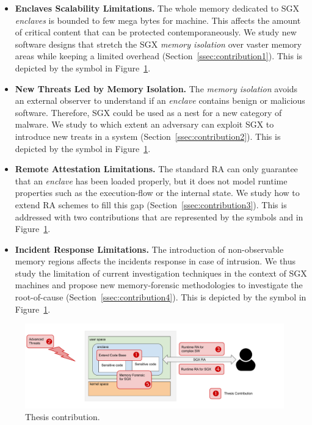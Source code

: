 \begin{itemize}
	\item \textbf{Enclaves Scalability Limitations.} The whole memory dedicated 
	to SGX \emph{enclaves} is bounded to few mega bytes for machine. This 
	affects the amount of critical content that can be protected 
	contemporaneously.
	We study new software designs that stretch the SGX \emph{memory isolation} 
	over vaster memory areas while keeping a limited overhead 
	(Section~\ref{ssec:contribution1}).
	This is depicted by the symbol \circledr[1] in 
	Figure~\ref{fig:contribution}.
	
	\item \textbf{New Threats Led by Memory Isolation.} The \emph{memory 
	isolation} avoids an external observer to understand if an \emph{enclave} 
	contains benign or malicious software. Therefore, SGX could be used as a 
	nest for a new category of malware.
	We study to which extent an adversary can exploit SGX to introduce new 
	treats 	in a system (Section~\ref{ssec:contribution2}).
	This is depicted by the symbol \circledr[2] in 	
	Figure~\ref{fig:contribution}.
	
	\item \textbf{Remote Attestation Limitations.} The standard RA can only 
	guarantee that an \emph{enclave} has been loaded properly, but it does 
	not model runtime properties such as the execution-flow or the internal 
	state.
	We study how to extend RA schemes to fill this gap 	
	(Section~\ref{ssec:contribution3}).
	This is addressed with two contributions that are represented by the 
	symbols \circledr[3] and \circledr[4] in Figure~\ref{fig:contribution}.
	
	\item \textbf{Incident Response Limitations.} The introduction of 
	non-observable memory regions affects the incidents response in 
	case of intrusion. We thus study the limitation of current investigation 
	techniques in the context of SGX machines and propose new memory-forensic 
	methodologies to investigate the root-of-cause
	(Section~\ref{ssec:contribution4}).
	This is depicted by the symbol \circledr[5] in 
	Figure~\ref{fig:contribution}.
\end{itemize}

\begin{figure}[t]
	\centering
	\includegraphics[width=\textwidth]{fig_c1/contribution.pdf}
	\caption[Thesis contribution.]{Thesis contribution.}
	\label{fig:contribution}
\end{figure}

